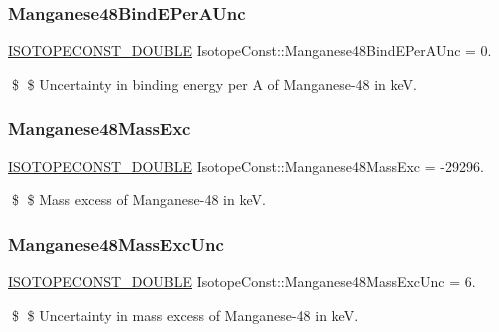 \subsubsection{\texorpdfstring{Manganese48\+Bind\+E\+Per\+A\+Unc}{Manganese48BindEPerAUnc}}
{\footnotesize\ttfamily \mbox{\hyperlink{group___isotope_const-_macros_ga8f45a7272ce02c0b4c65c44636ed719a}{I\+S\+O\+T\+O\+P\+E\+C\+O\+N\+S\+T\+\_\+\+D\+O\+U\+B\+LE}} Isotope\+Const\+::\+Manganese48\+Bind\+E\+Per\+A\+Unc = 0.}

\$ \$ Uncertainty in binding energy per A of Manganese-\/48 in keV. \mbox{\label{group___isotope_const-_manganese-_mn48_ga5f792fa20900b72b1d52d566e9ef4909}} 
\subsubsection{\texorpdfstring{Manganese48\+Mass\+Exc}{Manganese48MassExc}}
{\footnotesize\ttfamily \mbox{\hyperlink{group___isotope_const-_macros_ga8f45a7272ce02c0b4c65c44636ed719a}{I\+S\+O\+T\+O\+P\+E\+C\+O\+N\+S\+T\+\_\+\+D\+O\+U\+B\+LE}} Isotope\+Const\+::\+Manganese48\+Mass\+Exc = -\/29296.}

\$ \$ Mass excess of Manganese-\/48 in keV. \mbox{\label{group___isotope_const-_manganese-_mn48_ga3f3ef199e16abbb37e51e36fa110fcb4}} 
\subsubsection{\texorpdfstring{Manganese48\+Mass\+Exc\+Unc}{Manganese48MassExcUnc}}
{\footnotesize\ttfamily \mbox{\hyperlink{group___isotope_const-_macros_ga8f45a7272ce02c0b4c65c44636ed719a}{I\+S\+O\+T\+O\+P\+E\+C\+O\+N\+S\+T\+\_\+\+D\+O\+U\+B\+LE}} Isotope\+Const\+::\+Manganese48\+Mass\+Exc\+Unc = 6.}

\$ \$ Uncertainty in mass excess of Manganese-\/48 in keV. \mbox{\label{group___isotope_const-_manganese-_mn48_ga9c61cfdbcaa1b260fa60e8bf13b518a8}} 
